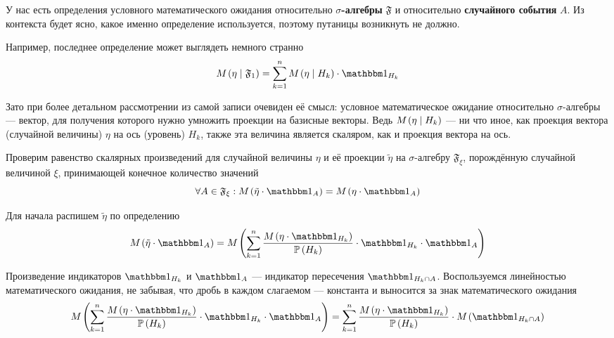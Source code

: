 \begin{remark}
    У нас есть определения условного математического ожидания
    относительно \textbf{$\sigma$-алгебры} $\mathfrak{F}$
    и относительно \textbf{случайного события} $A$.
    Из контекста будет ясно, какое именно определение используется,
    поэтому путаницы возникнуть не должно.

    Например, последнее определение может выглядеть немного странно
    $$\mean{\left( \eta \mid \mathfrak{F}_1 \right)}
        = \sum_{k=1}^n \mean{\left( \eta \mid H_k \right)}
            \cdot \indicatorof{H_k}$$

    Зато при более детальном рассмотрении из самой записи очевиден её смысл:
    условное математическое ожидание относительно $\sigma$-алгебры --- вектор,
    для получения которого нужно умножить проекции на базисные векторы.
    Ведь $M_{} \left( \eta \mid H_k \right)$ --- ни что иное, как проекция
    вектора (случайной величины) $\eta$ на ось (уровень) $H_k$,
    также эта величина является скаляром, как и проекция вектора на ось.
\end{remark}

Проверим равенство скалярных произведений
для случайной величины $\eta$ и её проекции $\tilde{\eta}$
на $\sigma$-алгебру $\mathfrak{F}_\xi$,
порождённую случайной величиной $\xi$, принимающей конечное количество значений
\begin{equation}\label{scalarMulEquality}
    \forall A \in \mathfrak{F}_\xi:
        \mean{\left( \tilde{\eta} \cdot \indicatorof{A} \right)}
            = \mean{\left( \eta \cdot \indicatorof{A} \right)}
\end{equation}

Для начала распишем $\tilde{\eta}$ по определению
$$\mean{\left( \tilde{\eta} \cdot \indicatorof{A} \right)}
    = \mean{\left( \sum_{k=1}^n
        \frac{\mean{\left( \eta \cdot \indicatorof{H_k} \right)}}
            {\probability{H_k}}
        \cdot \indicatorof{H_k} \cdot \indicatorof{A} \right)}$$

Произведение индикаторов $\indicatorof{H_k}$ и $\indicatorof{A}$ --- индикатор
пересечения $\indicatorof{H_k \cap A}$.
Воспользуемся линейностью математического ожидания, не забывая,
что дробь в каждом слагаемом --- константа
и выносится за знак математического ожидания
$$\mean{\left( \sum_{k=1}^n
        \frac{\mean{\left( \eta \cdot \indicatorof{H_k} \right)}}
            {\probability{H_k}}
        \cdot \indicatorof{H_k} \cdot \indicatorof{A} \right)}
    = \sum_{k=1}^n
        \frac{\mean{\left( \eta \cdot \indicatorof{H_k} \right)}}
            {\probability{H_k}}
        \cdot \mean{\left( \indicatorof{H_k \cap A} \right)}$$

